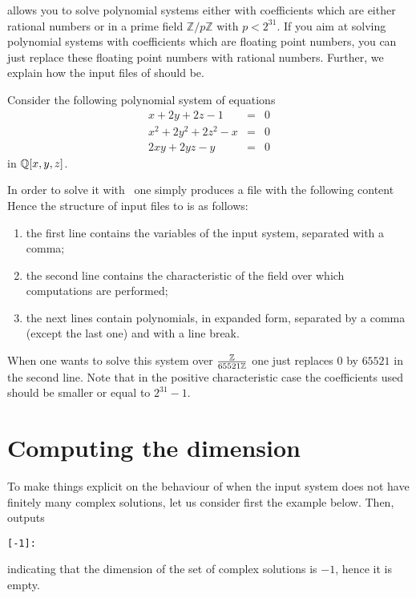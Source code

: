 \documentclass[a4paper,english,11pt]{scrartcl}
\theoremstyle{definition}
\theoremstyle{remark}
\begin{document}
\msolve allows you to solve polynomial systems either with coefficients
which are either rational numbers or in a prime field $\mathbb{Z}/p\mathbb{Z}$
with $p < 2^{31}$. If you aim at solving polynomial systems with coefficients
which are floating point numbers, you can just replace these floating point
numbers with rational numbers. Further, we explain how the input files of
\msolve should be.

Consider the following polynomial system of equations
\[
  \begin{array}{rcl}
    x+2 y+2 z-1 &= &0\\
    x^2+2 y^2+2 z^2-x &= &0\\
    2 x y+2 y z-y &= &0
  \end{array}
\]
in $\mathbb{Q}[x,y,z]$.

In order to solve it with \msolve~one simply produces a file with the following content
Hence the structure of input files to \msolve is as follows:
\begin{enumerate}
\item the first line contains the variables of the input system, separated with
  a comma; 
\item the second line contains the characteristic of the field over which
  computations are performed; 
\item the next lines contain polynomials, in expanded form, separated by a comma
  (except the last one) and with a line break. 
\end{enumerate}



When one wants to solve this system over $\frac{\mathbb{Z}}{65521\mathbb{Z}}$ one just replaces
$0$ by $65521$ in the second line. Note that in the positive characteristic case
the coefficients used should be smaller or equal to $2^{31}-1$.


\section{Computing the dimension}\label{sec:dim}

To make things explicit on the behaviour of \msolve when the input system
does not have finitely many complex solutions, let us consider first the example
below.
Then, \msolve outputs
\begin{tcolorbox} %
  \begin{lstlisting}[basicstyle=\normalsize\ttfamily]
[-1]:
  \end{lstlisting}
\end{tcolorbox}
indicating that the dimension of the set of complex solutions is $-1$, hence it
is empty.
\end{document}
